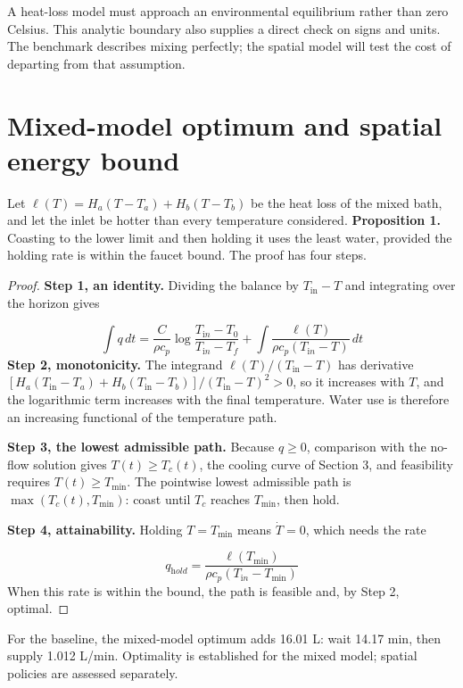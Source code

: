 \documentclass[12pt,a4paper]{article}
\begin{document}
A heat-loss model must approach an environmental equilibrium rather than zero Celsius. This analytic boundary also supplies a direct check on signs and units. The benchmark describes mixing perfectly; the spatial model will test the cost of departing from that assumption.

\section{Mixed-model optimum and spatial energy bound}
Let $\ell(T)=H_a(T-T_a)+H_b(T-T_b)$ be the heat loss of the mixed bath, and let the inlet be hotter than every temperature considered. \textbf{Proposition 1.} Coasting to the lower limit and then holding it uses the least water, provided the holding rate is within the faucet bound. The proof has four steps.

\begin{proof}
\textbf{Step 1, an identity.} Dividing the balance by $T_{\mathrm{in}}-T$ and integrating over the horizon gives

\begin{equation}\int q\,dt=\frac{C}{\rho c_p}\log\frac{T_{\mathrm in}-T_0}{T_{\mathrm in}-T_f}+\int\frac{\ell(T)}{\rho c_p(T_{\mathrm in}-T)}\,dt\end{equation}
\textbf{Step 2, monotonicity.} The integrand $\ell(T)/(T_{\mathrm{in}}-T)$ has derivative $[H_a(T_{\mathrm{in}}-T_a)+H_b(T_{\mathrm{in}}-T_b)]/(T_{\mathrm{in}}-T)^2>0$, so it increases with $T$, and the logarithmic term increases with the final temperature. Water use is therefore an increasing functional of the temperature path.

\textbf{Step 3, the lowest admissible path.} Because $q\ge 0$, comparison with the no-flow solution gives $T(t)\ge T_c(t)$, the cooling curve of Section 3, and feasibility requires $T(t)\ge T_{\min}$. The pointwise lowest admissible path is $\max(T_c(t),T_{\min})$: coast until $T_c$ reaches $T_{\min}$, then hold.

\textbf{Step 4, attainability.} Holding $T=T_{\min}$ means $\dot T=0$, which needs the rate

\begin{equation}q_{\mathrm hold}=\frac{\ell(T_{\min})}{\rho c_p(T_{\mathrm in}-T_{\min})}\end{equation}
When this rate is within the bound, the path is feasible and, by Step 2, optimal.

\end{proof}
For the baseline, the mixed-model optimum adds 16.01 L: wait 14.17 min, then supply 1.012 L/min. Optimality is established for the mixed model; spatial policies are assessed separately.
\end{document}
